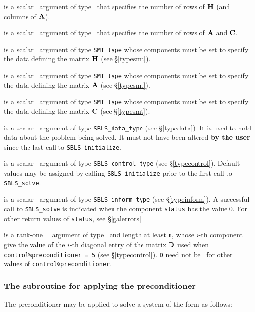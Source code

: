 \documentclass{galahad}
\newcommand{\packagename}{SBLS}
\begin{document}
\begin{description}
 is a scalar \intentin\ argument of type \integer\ that specifies
the number of rows of ${\mathbf{H}}$ (and columns of ${\mathbf{A}}$).

 is a scalar \intentin\ argument of type \integer\ that specifies
the number of rows of ${\mathbf{A}}$ and ${\mathbf{C}}$.

 is a scalar \intentin\ argument of type {\tt SMT\_type} whose
components must be set to specify the data defining the matrix ${\mathbf{H}}$
(see \S\ref{typesmt}).

 is a scalar \intentin\ argument of type {\tt SMT\_type} whose
components must be set to specify the data defining the matrix ${\mathbf{A}}$
(see \S\ref{typesmt}).

 is a scalar \intentin\ argument of type {\tt SMT\_type} whose
components must be set to specify the data defining the matrix ${\mathbf{C}}$
(see \S\ref{typesmt}).

 is a scalar \intentinout\ argument of type
{\tt \packagename\_data\_type}
(see \S\ref{typedata}). It is used to hold data about the problem being
solved. It must not have been altered {\bf by the user} since the last call to
{\tt \packagename\_initialize}.

 is a scalar \intentin\ argument of type
{\tt \packagename\_control\_type}
(see \S\ref{typecontrol}). Default values may be assigned by calling
{\tt \packagename\_initialize} prior to the first call to
{\tt \packagename\_solve}.

 is a scalar \intentout\ argument of type
{\tt \packagename\_inform\_type}
(see \S\ref{typeinform}). A successful call to
{\tt \packagename\_solve}
is indicated when the  component {\tt status} has the value 0.
For other return values of {\tt status}, see \S\ref{galerrors}.

 is a rank-one \optional\ \intentin\ argument of type \realdp\
and length at least {\tt n}, whose $i$-th component give the value of the
$i$-th diagonal entry of the matrix ${\mathbf{D}}$ used when
{\tt control\%pre\-conditioner = 5} (see \S\ref{typecontrol}).
{\tt D} need not be \present\ for other values of {\tt control\%preconditio\-ner}.

\end{description}

\subsubsection{The subroutine for applying the preconditioner}
The preconditioner may be applied to solve a system of the
form  as follows:
\vspace*{1mm}
\end{document}
